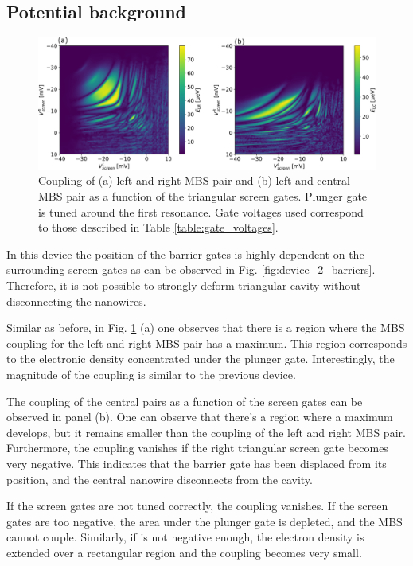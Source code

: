 \subsection{Potential background}

\begin{figure}[h!]
\centering
  \includegraphics[width=\linewidth]{figures/device_2_screens.pdf}
  \caption{Coupling of (a) left and right MBS pair and (b) left and central MBS pair as a function of the triangular screen gates. Plunger gate is tuned around the first resonance. Gate voltages used correspond to those described in Table \ref{table:gate_voltages}.}
  \label{fig:device_2_screens}
\end{figure}

In this device the position of the barrier gates is highly dependent on the surrounding screen gates as can be observed in Fig. \ref{fig:device_2_barriers}.
Therefore, it is not possible to strongly deform triangular cavity without disconnecting the nanowires.

Similar as before, in Fig. \ref{fig:device_2_screens} (a) one observes that there is a region where the MBS coupling for the left and right MBS pair has a maximum.
This region corresponds to the electronic density concentrated under the plunger gate.
Interestingly, the magnitude of the coupling is similar to the previous device.

The coupling of the central pairs as a function of the screen gates can be observed in panel (b).
One can observe that there's a region where a maximum develops, but it remains smaller than the coupling of the left and right MBS pair.
Furthermore, the coupling vanishes if the right triangular screen gate becomes very negative.
This indicates that the barrier gate has been displaced from its position, and the central nanowire disconnects from the cavity.

If the screen gates are not tuned correctly, the coupling vanishes.
If the screen gates are too negative, the area under the plunger gate is depleted, and the MBS cannot couple.
Similarly, if is not negative enough, the electron density is extended over a rectangular region and the coupling becomes very small.

